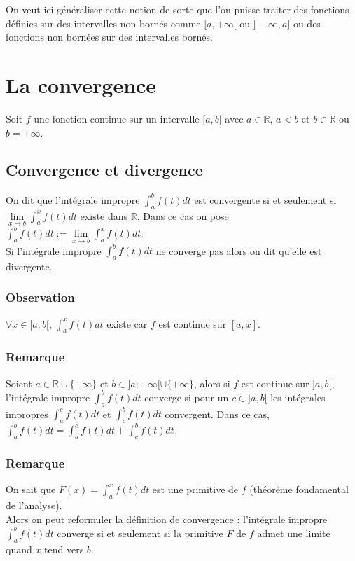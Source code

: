 \documentclass[a4paper,10pt]{book} %
\newcommand{\R}{\mathbb{R}}
\newcommand{\displayAmath}{\displaystyle}
\begin{document}
On veut ici généraliser cette notion de sorte que l'on puisse traiter des fonctions définies sur des intervalles non bornés comme $[a,+\infty[$ ou $ ]-\infty,a]$ ou des fonctions non bornées sur des intervalles bornés.

\section{La convergence}
Soit $f$ une fonction continue sur un intervalle $[a,b[$ avec $a\in\R$, $a<b$ et $b\in\R$ ou $b=+\infty$.

\subsection{Convergence et divergence}
On dit que l'intégrale impropre $\displaystyle \int_{a}^{b}f(t)dt$ est convergente si et seulement si $\displaystyle\lim\limits_{x\rightarrow b}\int_a^xf(t)dt$ existe dans $\R$. Dans ce cas on pose $\displaystyle\int_a^bf(t)dt:=\lim\limits_{x\rightarrow b}\int_a^xf(t)dt$.\\

Si l'intégrale impropre $\displayAmath\int_a^bf(t)dt$ ne converge pas alors on dit qu'elle est divergente.

\subsubsection{Observation}
$\forall x\in [a,b[$, $\displayAmath\int_a^xf(t)dt$ existe car $f$ est continue sur $[a,x]$.

\subsubsection{Remarque}
Soient $a\in\R\cup\{-\infty\}$ et $b\in]a;+\infty[\cup\{+\infty\}$, alors si $f$ est continue sur $]a,b[$, l'intégrale impropre $\displayAmath\int_a^bf(t)dt$ converge si pour un $c\in ]a,b[$ les intégrales impropres $\displayAmath\int_a^cf(t)dt$ et $\displayAmath\int_c^bf(t)dt$ convergent.
Dans ce cas, $\displayAmath\int_a^bf(t)dt=\displayAmath\int_a^cf(t)dt+\displayAmath\int_c^bf(t)dt$.

\subsubsection{Remarque}
On sait que $F(x)=\int_{a}^{x}f(t)dt$ est une primitive de $f$ (théorème fondamental de l'analyse).\\
Alors on peut reformuler la définition de convergence : 
l'intégrale impropre $\int_{a}^{b} f(t)dt$ converge si et seulement si la primitive $F$ de $f$ admet une limite quand $x$ tend vers $b$.
\end{document}
